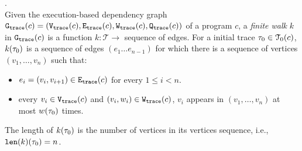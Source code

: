 \begin{defn}.
  \label{def:finitewalk}
  \\
  Given the execution-based dependency graph $\mathtt{{G_{trace}}}({c}) = (\mathtt{{V_{trace}}}({c}), \mathtt{{E_{trace}}}({c}), \mathtt{{W_{trace}}}({c}), \mathtt{{Q_{trace}}}({c}))$ of a program $c$,
  a \emph{finite walk} $k$ in $\mathtt{{G_{trace}}}({c})$ is a 
  function $k: \mathcal{T} \to $ sequence of edges.
  For a initial trace $\mathtt{\tau}_0 \in \mathcal{T}_0(c)$, 
  $k(\mathtt{\tau}_0)$ is a sequence of edges $(e_1 \ldots e_{n - 1})$ 
  for which there is a sequence of vertices 
  $(v_1, \ldots, v_{n})$ such that:
  \begin{itemize}
      \item $e_i = (v_{i},v_{i + 1}) \in \mathtt{{E_{trace}}}(c)$ for every $1 \leq i < n$.
      \item every $v_i \in \mathtt{{V_{trace}}}(c)$
      and $(v_i, w_i) \in \mathtt{{W_{trace}}}(c)$, 
       $v_i$ appears in $(v_1, \ldots, v_{n})$ at most 
    $w(\mathtt{\tau}_0)$
      times.  
  \end{itemize}
  The length of $k(\mathtt{\tau}_0)$ is the number of vertices in its vertices sequence, i.e., $\mathtt{len}(k)(\mathtt{\tau}_0) = n$.
 \end{defn}

